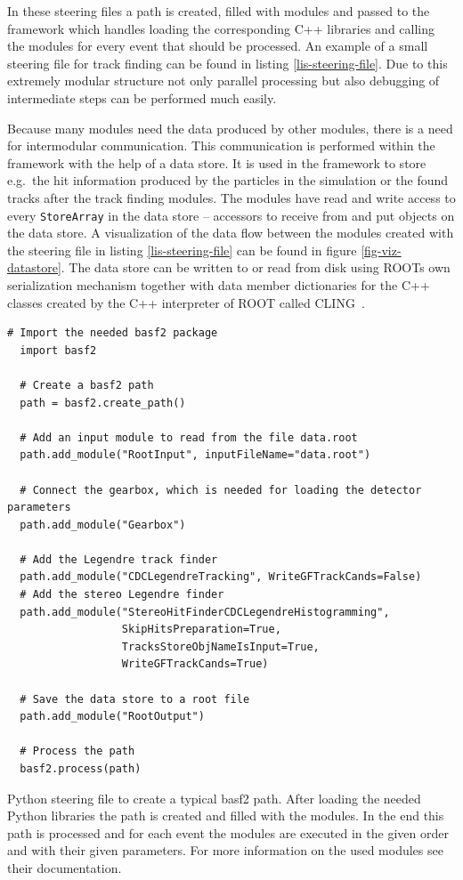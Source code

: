 In these steering files a path is created, filled with modules and passed to the framework which handles loading the corresponding C++ libraries and calling the modules for every event that should be processed. An example of a small steering file for track finding can be found in listing \ref{lis-steering-file}. Due to this extremely modular structure not only parallel processing but also debugging of intermediate steps can be performed much easily.

Because many modules need the data produced by other modules, there is a need for intermodular communication. This communication is performed within the framework with the help of a data store. It is used in the framework to store e.g.\ the hit information produced by the particles in the simulation or the found tracks after the track finding modules. The modules have read and write access to every \texttt{StoreArray} in the data store -- accessors to receive from and put objects on the data store. A visualization of the data flow between the modules created with the steering file in listing \ref{lis-steering-file} can be found in figure \ref{fig-viz-datastore}. The data store can be written to or read from disk using ROOTs own serialization mechanism together with data member dictionaries for the C++ classes created by the C++ interpreter of ROOT called CLING~\cite{cling}.

\begin{listing}
 \begin{lstlisting}[style=customP]
  # Import the needed basf2 package
  import basf2

  # Create a basf2 path
  path = basf2.create_path()

  # Add an input module to read from the file data.root
  path.add_module("RootInput", inputFileName="data.root")
  
  # Connect the gearbox, which is needed for loading the detector parameters
  path.add_module("Gearbox")

  # Add the Legendre track finder
  path.add_module("CDCLegendreTracking", WriteGFTrackCands=False)
  # Add the stereo Legendre finder
  path.add_module("StereoHitFinderCDCLegendreHistogramming",
                  SkipHitsPreparation=True,
                  TracksStoreObjNameIsInput=True,
                  WriteGFTrackCands=True)
  
  # Save the data store to a root file
  path.add_module("RootOutput")

  # Process the path
  basf2.process(path)

 \end{lstlisting}
 \caption[Python steering file to create a typical basf2 path.]{Python steering file to create a typical basf2 path. After loading the needed Python libraries the path is created and filled with the modules. In the end this path is processed and for each event the modules are executed in the given order and with their given parameters. For more information on the used modules see their documentation.}
 \label{lis-steering-file}
\end{listing}


